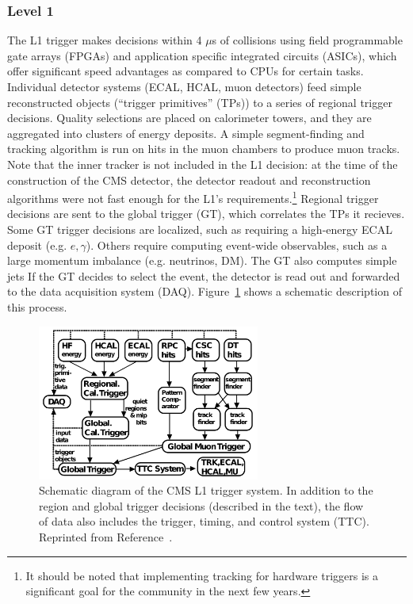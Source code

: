 \subsubsection{Level 1}

The L1 trigger makes decisions within 4 $\mu$s of collisions using field programmable gate arrays (FPGAs) and application specific integrated circuits (ASICs), which offer significant speed advantages as compared to CPUs for certain tasks.
Individual detector systems (ECAL, HCAL, muon detectors) feed simple reconstructed objects (``trigger primitives'' (TPs)) to a series of regional trigger decisions.
Quality selections are placed on calorimeter towers, and they are aggregated into clusters of energy deposits.
A simple segment-finding and tracking algorithm is run on hits in the muon chambers to produce muon tracks.
Note that the inner tracker is not included in the L1 decision: at the time of the construction of the CMS detector, the detector readout and reconstruction algorithms were not fast enough for the L1's requirements.\footnote{It should be noted that implementing tracking for hardware triggers is a significant goal for the community in the next few years.}
Regional trigger decisions are sent to the global trigger (GT), which correlates the TPs it recieves.
Some GT trigger decisions are localized, such as requiring a high-energy ECAL deposit (e.g. $e,\gamma$).
Others require computing event-wide observables, such as a large momentum imbalance (e.g. neutrinos, DM).
The GT also computes simple jets
If the GT decides to select the event, the detector is read out and forwarded to the data acquisition system (DAQ).
Figure~\ref{fig:cms:l1} shows a schematic description of this process.

\begin{figure}[]
\begin{center}
	\includegraphics[width=0.65\textwidth]{figures/cms/l1.png}
	\caption{Schematic diagram of the CMS L1 trigger system.
			 In addition to the region and global trigger decisions (described in the text), the flow of data also includes the trigger, timing, and control system (TTC).
				Reprinted from Reference~\cite{cmstrig}.}
	\label{fig:cms:l1}
\end{center}
\end{figure}

